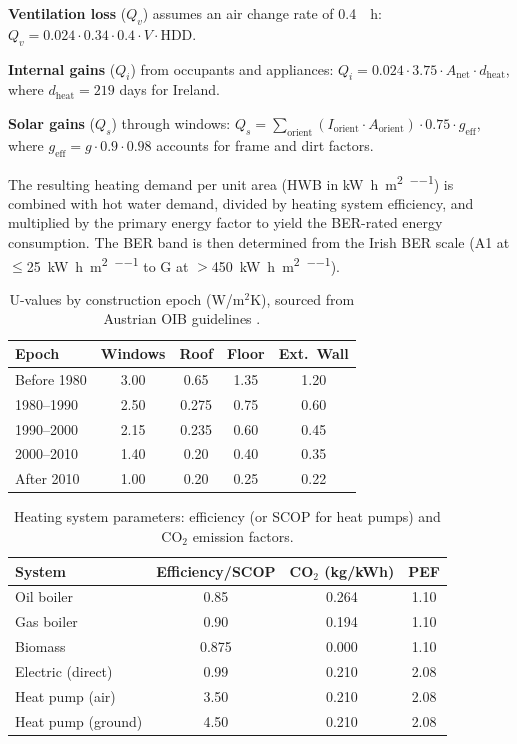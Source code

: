 \documentclass[preprint,12pt,authoryear]{elsarticle}
\begin{document}
\textbf{Ventilation loss} ($Q_v$) assumes an air change rate of \SI{0.4}{\per\hour}: $Q_v = 0.024 \cdot 0.34 \cdot 0.4 \cdot V \cdot \text{HDD}$.

\textbf{Internal gains} ($Q_i$) from occupants and appliances: $Q_i = 0.024 \cdot 3.75 \cdot A_{\text{net}} \cdot d_{\text{heat}}$, where $d_{\text{heat}} = 219$ days for Ireland.

\textbf{Solar gains} ($Q_s$) through windows: $Q_s = \sum_{\text{orient}} (I_{\text{orient}} \cdot A_{\text{orient}}) \cdot 0.75 \cdot g_{\text{eff}}$, where $g_{\text{eff}} = g \cdot 0.9 \cdot 0.98$ accounts for frame and dirt factors.

The resulting heating demand per unit area (HWB in \si{\kilo\watt\hour\per\square\metre\per\year}) is combined with hot water demand, divided by heating system efficiency, and multiplied by the primary energy factor to yield the BER-rated energy consumption. The BER band is then determined from the Irish BER scale (A1 at $\leq$\SI{25}{\kilo\watt\hour\per\square\metre\per\year} to G at $>$\SI{450}{\kilo\watt\hour\per\square\metre\per\year}).

\begin{table}[htbp]
\centering
\caption{U-values by construction epoch (W/m$^2$K), sourced from Austrian OIB guidelines \citep{hwb_leitfaden_2019}.}
\label{tab:uvalues}
\begin{tabular}{@{}lcccc@{}}
\toprule
Epoch & Windows & Roof & Floor & Ext.\ Wall \\
\midrule
Before 1980  & 3.00 & 0.65 & 1.35 & 1.20 \\
1980--1990   & 2.50 & 0.275 & 0.75 & 0.60 \\
1990--2000   & 2.15 & 0.235 & 0.60 & 0.45 \\
2000--2010   & 1.40 & 0.20 & 0.40 & 0.35 \\
After 2010   & 1.00 & 0.20 & 0.25 & 0.22 \\
\bottomrule
\end{tabular}
\end{table}

\begin{table}[htbp]
\centering
\caption{Heating system parameters: efficiency (or SCOP for heat pumps) and CO$_2$ emission factors.}
\label{tab:heating}
\begin{tabular}{@{}lccc@{}}
\toprule
System & Efficiency/SCOP & CO$_2$ (kg/kWh) & PEF \\
\midrule
Oil boiler         & 0.85 & 0.264 & 1.10 \\
Gas boiler         & 0.90 & 0.194 & 1.10 \\
Biomass            & 0.875 & 0.000 & 1.10 \\
Electric (direct)  & 0.99 & 0.210 & 2.08 \\
Heat pump (air)    & 3.50 & 0.210 & 2.08 \\
Heat pump (ground) & 4.50 & 0.210 & 2.08 \\
\bottomrule
\end{tabular}
\end{table}
\end{document}
